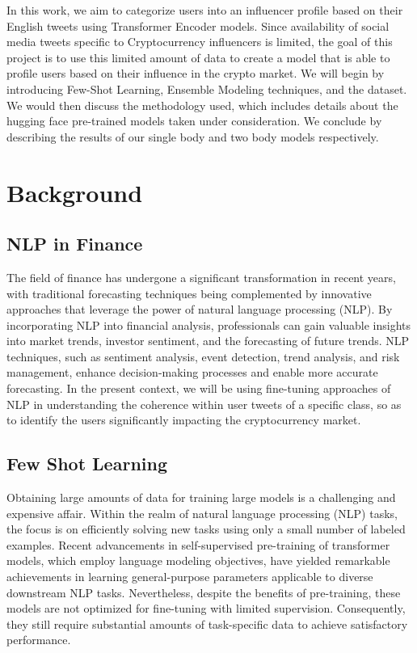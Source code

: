 \documentclass[]{ceurart}
\begin{document}
In this work, we aim to categorize users into an influencer profile based on their English tweets using Transformer Encoder models. Since availability of social media tweets specific to Cryptocurrency influencers is limited, the goal of this project is to use this limited amount of data to create a model that is able to profile users based on their influence in the crypto market. We will begin by introducing Few-Shot Learning, Ensemble Modeling techniques, and the dataset. We would then discuss the methodology used, which includes details about the hugging face pre-trained models taken under consideration. We conclude by describing the results of our single body and two body models respectively. 

\section{Background}
\subsection{NLP in Finance}
The field of finance has undergone a significant transformation in recent years, with traditional forecasting techniques being complemented by innovative approaches that leverage the power of natural language processing (NLP). By incorporating NLP into financial analysis, professionals can gain valuable insights into market trends, investor sentiment, and the forecasting of future trends. NLP techniques, such as sentiment analysis, event detection, trend analysis, and risk management, enhance decision-making processes and enable more accurate forecasting. In the present context, we will be using fine-tuning approaches of NLP in understanding the coherence within user tweets of a specific class, so as to identify the users significantly impacting the cryptocurrency market.

\subsection{Few Shot Learning}
Obtaining large amounts of data for training large models is a challenging and expensive affair. Within the realm of natural language processing (NLP) tasks, the focus is on efficiently solving new tasks using only a small number of labeled examples. Recent advancements in self-supervised pre-training of transformer models, which employ language modeling objectives, have yielded remarkable achievements in learning general-purpose parameters applicable to diverse downstream NLP tasks. Nevertheless, despite the benefits of pre-training, these models are not optimized for fine-tuning with limited supervision. Consequently, they still require substantial amounts of task-specific data to achieve satisfactory performance.
\end{document}
